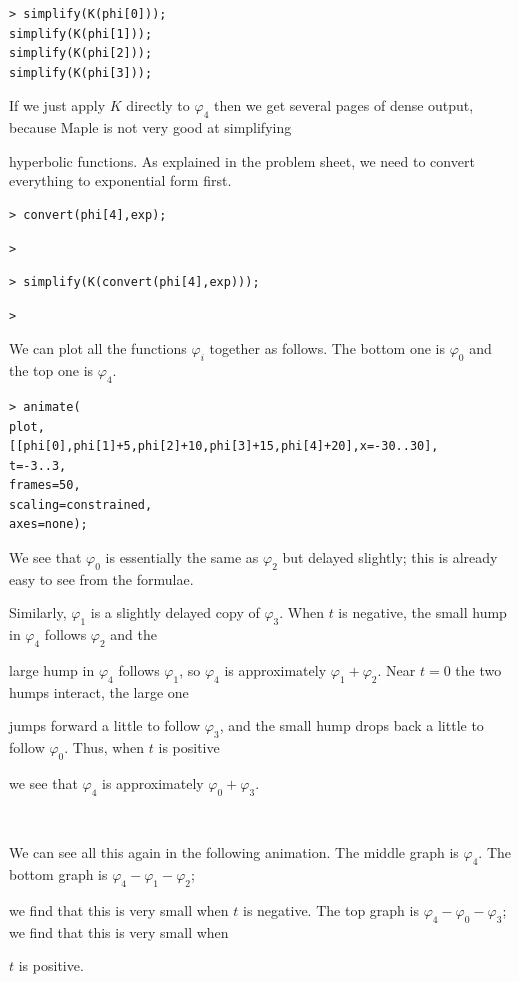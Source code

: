 \documentclass{article}
\begin{document}
\begin{lstlisting}
> simplify(K(phi[0]));
simplify(K(phi[1]));
simplify(K(phi[2]));
simplify(K(phi[3]));
\end{lstlisting}
\begin{Maple Normal}
If we just apply 
$K$ directly to 
$\varphi_{4}$ then we get several pages of dense output, because Maple is not very good at simplifying\

hyperbolic functions.  As explained in the problem sheet, we need to convert everything to exponential form first.
\end{Maple Normal}
\begin{lstlisting}
> convert(phi[4],exp);
\end{lstlisting}
\begin{lstlisting}
> 
\end{lstlisting}
\begin{lstlisting}
> simplify(K(convert(phi[4],exp)));
\end{lstlisting}
\begin{lstlisting}
> 
\end{lstlisting}
\begin{Maple Normal}
We can plot all the functions 
$\varphi_{i}$ together as follows.  The bottom one is 
$\varphi_{0}$ and the top one is 
$\varphi_{4}$.
\end{Maple Normal}
\begin{lstlisting}
> animate(
plot,
[[phi[0],phi[1]+5,phi[2]+10,phi[3]+15,phi[4]+20],x=-30..30],
t=-3..3,
frames=50,
scaling=constrained,
axes=none);
\end{lstlisting}
\begin{Maple Normal}
We see that 
$\varphi_{0}$ is essentially the same as 
$\varphi_{2}$ but delayed slightly; this is already easy to see from the formulae.\

Similarly, 
$\varphi_{1}$ is a slightly delayed copy of 
$\varphi_{3}$.  When 
$t$ is negative, the small hump in 
$\varphi_{4}$ follows 
$\varphi_{2}$ and the \

large hump in 
$\varphi_{4}$ follows 
$\varphi_{1}$, so 
$\varphi_{4}$ is approximately 
$\varphi_{1}+\varphi_{2}$.  Near 
$t =0$ the two humps interact, the large one\

jumps forward a little to follow 
$\varphi_{3}$, and the small hump drops back a little to follow 
$\varphi_{0}$.  Thus, when 
$t$ is positive\

we see that 
$\varphi_{4}$ is approximately 
$\varphi_{0}+\varphi_{3}$.\

\

We can see all this again in the following animation.  The middle graph is 
$\varphi_{4}$.  The bottom graph is 
$\varphi_{4}-\varphi_{1}-\varphi_{2}$; \

we find that this is very small when 
$t$ is negative.  The top graph is 
$\varphi_{4}-\varphi_{0}-\varphi_{3}$; we find that this is very small when\


$t$ is positive. 
\end{Maple Normal}
\end{document}

